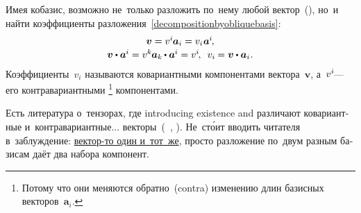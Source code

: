 \begin{otherlanguage}{russian}
\begin{tcolorbox}
\par\end{tcolorbox}

Имея кобазис, возможно не~только разложить по~нему любой вектор~(), но~и найти коэффициенты разложения~\eqref{decompositionbyobliquebasis}:
\begin{equation}\begin{array}{c}
\bm{v} = v^{i} \hspace{-0.1ex} \bm{a}_i = v_{i} \hspace{.1ex} \bm{a}^{\hspace{-0.05ex}i} \hspace{-0.25ex},
\\[.16em]
\bm{v} \dotp \bm{a}^{\hspace{-0.05ex}i} = v^{k} \hspace{-0.1ex} \bm{a}_k \hspace{-0.1ex} \dotp \bm{a}^{\hspace{-0.05ex}i} = v^{i} \hspace{-0.25ex}, \:\;
v_{i} \hspace{-0.1ex} = \bm{v} \dotp \bm{a}_i \hspace{.1ex} .
\end{array}\end{equation}
\noindent
Коэффициенты~${v_i}$ называются ко\-вариант\-ными компонентами вектора~$\bm{v}$, а~${v^i \hspace{-0.25ex}}$\:--- его контра\-вариант\-ными%
\footnote{Потому что они меняются обратно~(contra) изменению длин базисных векторов~${\bm{a}_i}$.}\hspace{-0.2ex}
компонентами.

Есть литература о~тензорах, где introducing existence and различают ко\-вариант\-ные и~контра\-вариант\-ные... векторы~(~, ).
Не~ст\'{о}ит вводить читателя в~заблуждение: \href{https://www.physicsforums.com/threads/is-a-vector-itself-contra-covariant-or-just-its-components.994318/}{вектор\hbox{-}то один и~тот~же}, просто разложение по~двум разным базисам даёт два набора компонент.




\end{otherlanguage}
